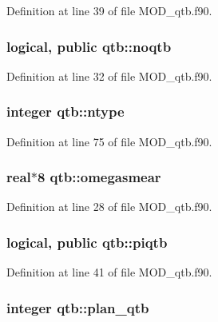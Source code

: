 Definition at line 39 of file M\-O\-D\-\_\-qtb.\-f90.

\hypertarget{classqtb_aa28fc5f309cb469a62634069b2d16444}{
\subsubsection[{noqtb}]{\setlength{\rightskip}{0pt plus 5cm}logical, public qtb\-::noqtb}}\label{classqtb_aa28fc5f309cb469a62634069b2d16444}


Definition at line 32 of file M\-O\-D\-\_\-qtb.\-f90.

\hypertarget{classqtb_a21744b9331333113a6c7a3f401c67047}{
\subsubsection[{ntype}]{\setlength{\rightskip}{0pt plus 5cm}integer qtb\-::ntype}}\label{classqtb_a21744b9331333113a6c7a3f401c67047}


Definition at line 75 of file M\-O\-D\-\_\-qtb.\-f90.

\hypertarget{classqtb_a848130400b3dc59232a882616d9beec0}{
\subsubsection[{omegasmear}]{\setlength{\rightskip}{0pt plus 5cm}real$\ast$8 qtb\-::omegasmear}}\label{classqtb_a848130400b3dc59232a882616d9beec0}


Definition at line 28 of file M\-O\-D\-\_\-qtb.\-f90.

\hypertarget{classqtb_a2bb4d73d947c3d5e3fb0c00dca3bfd26}{
\subsubsection[{piqtb}]{\setlength{\rightskip}{0pt plus 5cm}logical, public qtb\-::piqtb}}\label{classqtb_a2bb4d73d947c3d5e3fb0c00dca3bfd26}


Definition at line 41 of file M\-O\-D\-\_\-qtb.\-f90.

\hypertarget{classqtb_ab621da1de10f5405f43fac11e3e7c180}{
\subsubsection[{plan\-\_\-qtb}]{\setlength{\rightskip}{0pt plus 5cm}integer qtb\-::plan\-\_\-qtb}}\label{classqtb_ab621da1de10f5405f43fac11e3e7c180}


